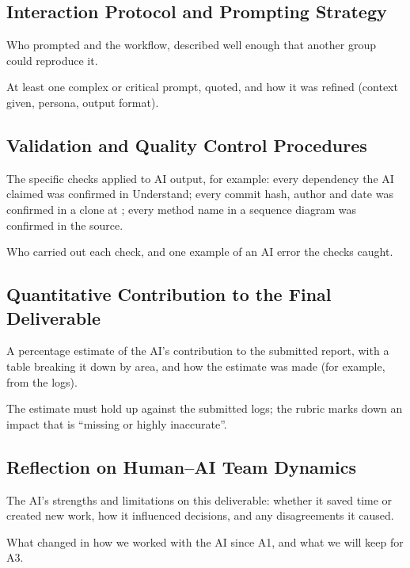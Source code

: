 \subsection{Interaction Protocol and Prompting Strategy}
\label{sec:ai-protocol}

\begin{requirements}
  \item Who prompted and the workflow, described well enough that another group could reproduce it.
  \item At least one complex or critical prompt, quoted, and how it was refined (context given, persona, output format).
\end{requirements}

\subsection{Validation and Quality Control Procedures}
\label{sec:ai-validation}

\begin{requirements}
  \item The specific checks applied to AI output, for example: every dependency the AI claimed was confirmed in Understand; every commit hash, author and date was confirmed in a clone at \pinnedcommit; every method name in a sequence diagram was confirmed in the source.
  \item Who carried out each check, and one example of an AI error the checks caught.
\end{requirements}

\subsection{Quantitative Contribution to the Final Deliverable}
\label{sec:ai-contribution}

\begin{requirements}
  \item A percentage estimate of the AI's contribution to the submitted report, with a table breaking it down by area, and how the estimate was made (for example, from the logs).
  \item The estimate must hold up against the submitted logs; the rubric marks down an impact that is ``missing or highly inaccurate''.
\end{requirements}

\subsection{Reflection on Human--AI Team Dynamics}
\label{sec:ai-reflection}

\begin{requirements}
  \item The AI's strengths and limitations on this deliverable: whether it saved time or created new work, how it influenced decisions, and any disagreements it caused.
  \item What changed in how we worked with the AI since A1, and what we will keep for A3.
\end{requirements}
